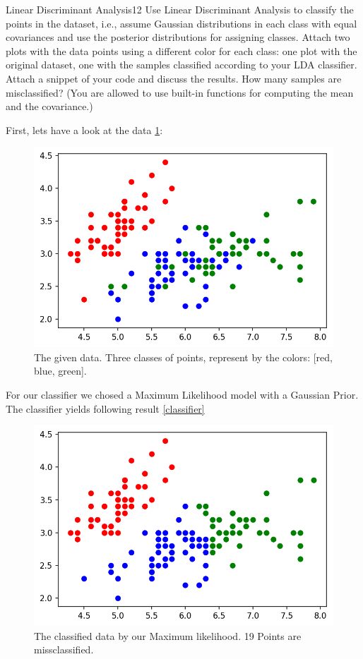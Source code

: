 \begin{questions}

\begin{question}{Linear Discriminant Analysis}{12}
Use Linear Discriminant Analysis to classify the points in the dataset, i.e., assume Gaussian distributions in each class with equal covariances and use the posterior distributions for assigning classes. Attach two plots with the data points using a different color for each class: one plot with the original dataset, one with the samples classified according to your LDA classifier. Attach a snippet of your code and discuss the results. How many samples are misclassified? (You are allowed to use built-in functions for computing the mean and the covariance.)

\begin{answer}\end{answer}
First, lets have a look at the data \ref{fig:classData}:
\begin{figure}[H]
	\includegraphics[width=0.6\linewidth]{pictures/OriginalData.png}
	\centering
	\caption{The given data. Three classes of points, represent by the colors: [red, blue, green].}
	\label{fig:classData}
\end{figure}

For our classifier we chosed a Maximum Likelihood model with a Gaussian Prior.
The classifier yields following result \ref{classifier}
\begin{figure}[H]
	\includegraphics[width=0.6\linewidth]{pictures/OurClassifier.png}
	\centering
	\caption{The classified data by our Maximum likelihood. 19 Points are missclassified.}
	\label{fig:classifier}
\end{figure}


\end{question}
\end{questions}
